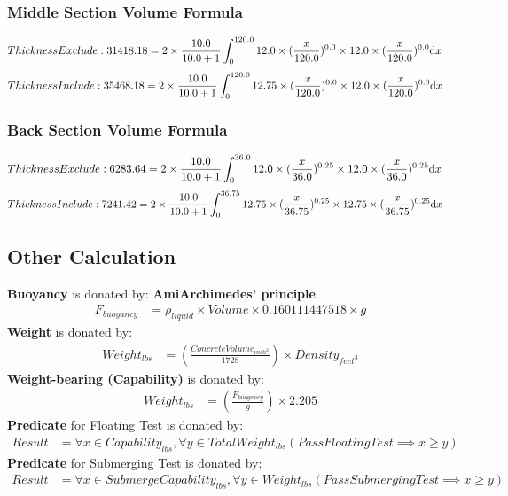 \documentclass{article}%
\begin{document}
%
\subsubsection{Middle Section Volume Formula}%
\label{ssubsec:MiddleSectionVolumeFormula}%
\begin{align}%
Thickness Exclude: 31418.18 &=2\times \frac{10.0}{10.0+1} \int_0^{120.0} 12.0\times(\frac{x}{120.0})^{0.0}\times 12.0\times(\frac{x}{120.0})^{0.0} \mathrm{d}x \notag%
\end{align}%
\begin{align}%
Thickness Include: 35468.18 &=2\times \frac{10.0}{10.0+1} \int_0^{120.0} 12.75\times(\frac{x}{120.0})^{0.0}\times 12.0\times(\frac{x}{120.0})^{0.0} \mathrm{d}x \notag%
\end{align}

%
\subsubsection{Back Section Volume Formula}%
\label{ssubsec:BackSectionVolumeFormula}%
\begin{align}%
Thickness Exclude: 6283.64 &=2\times \frac{10.0}{10.0+1} \int_0^{36.0} 12.0\times(\frac{x}{36.0})^{0.25}\times 12.0\times(\frac{x}{36.0})^{0.25} \mathrm{d}x \notag%
\end{align}%
\begin{align}%
Thickness Include: 7241.42 &=2\times \frac{10.0}{10.0+1} \int_0^{36.75} 12.75\times(\frac{x}{36.75})^{0.25}\times 12.75\times(\frac{x}{36.75})^{0.25} \mathrm{d}x \notag%
\end{align}

%
\subsection{Other Calculation}%
\label{subsec:OtherCalculation}%
\textbf{Buoyancy} is donated by: \textbf{AmiArchimedes' principle}%
\begin{align}%
F_{buoyancy} &=\rho_{liquid}\times Volume\times 0.160111447518 \times g\label{C}%
\end{align}%
\textbf{Weight} is donated by: %
\begin{align}%
Weight_{lbs} &=(\frac{ConcreteVolume_{inch^2}}{1728})\times Density_{feet^3}\label{D}%
\end{align}%
\textbf{Weight-bearing (Capability)} is donated by: %
\begin{align}%
Weight_{lbs} &=(\frac{F_{buoyancy}}{g})\times 2.205 \label{E}%
\end{align}%
\textbf{Predicate} for Floating Test is donated by: %
\begin{align}%
Result &= \forall x\in Capability_{lbs}, \forall y\in TotalWeight_{lbs} (Pass Floating Test \implies x \geq y) \label{E}%
\end{align}%
\textbf{Predicate} for Submerging Test is donated by: %
\begin{align}%
Result &= \forall x\in SubmergeCapability_{lbs}, \forall y\in Weight_{lbs} (Pass Submerging Test \implies x \geq y) \label{F}%
\end{align}
\end{document}
